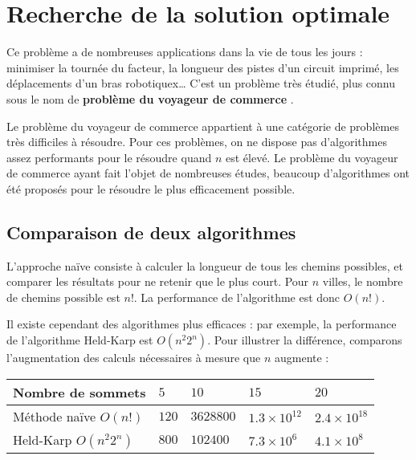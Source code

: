 \section*{Recherche de la solution optimale}

Ce problème a de nombreuses applications dans la vie de tous les jours :
minimiser la tournée du facteur, la longueur des pistes d'un circuit imprimé,
les déplacements d'un bras robotiquex{\ldots} C'est un problème très étudié,
plus connu sous le nom de \textbf{\og problème du voyageur de commerce \fg}.

Le problème du voyageur de commerce appartient à une catégorie de problèmes très
difficiles à résoudre. Pour ces problèmes, on ne dispose pas d'algorithmes assez
performants pour le résoudre quand $n$ est élevé. Le problème du voyageur de
commerce ayant fait l'objet de nombreuses études, beaucoup d'algorithmes ont été
proposés pour le résoudre le plus efficacement possible.

\subsection*{Comparaison de deux algorithmes}

L'approche naïve consiste à calculer la longueur de tous les chemins possibles,
et comparer les résultats pour ne retenir que le plus court. Pour $n$ villes, le
nombre de chemins possible est $n!$. La performance de l'algorithme est donc
$O(n!)$.

Il existe cependant des algorithmes plus efficaces : par exemple, la performance
de l'algorithme Held-Karp est $O(n^{2}2^n)$. Pour illustrer la différence,
comparons l'augmentation des calculs nécessaires à mesure que $n$ augmente :

\begin{center}
  \begin{tabular}{|l|llll|}
    \hline
    Nombre de sommets       & $5$   & $10$      & $15$            & $20$ \\
    \hline
    Méthode naïve $O(n!)$   & $120$ & $3628800$ & $1.3 \times 10^{12}$ & $2.4 \times 10^{18}$ \\
    Held-Karp $O(n^{2}2^n)$ & $800$ & $102400$  & $7.3 \times 10^6$       & $4.1 \times 10^8$ \\
    \hline
  \end{tabular} 
\end{center}

